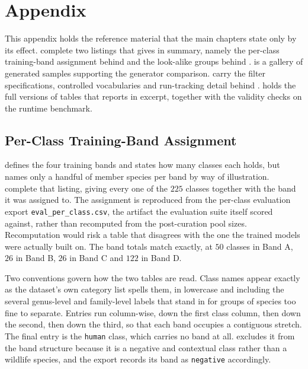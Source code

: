 \chapter{Appendix}\label{appendix}

This appendix holds the reference material that the main chapters state only by its effect.  complete two listings that  gives in summary, namely the per-class training-band assignment behind  and the look-alike groups behind .  is a gallery of generated samples supporting the generator comparison.  carry the filter specifications, controlled vocabularies and run-tracking detail behind .  holds the full versions of tables that  reports in excerpt, together with the validity checks on the runtime benchmark.

\section{Per-Class Training-Band Assignment}\label{sec:appendix_band_assignment}

 defines the four training bands and states how many classes each holds, but names only a handful of member species per band by way of illustration.  complete that listing, giving every one of the $225$ classes together with the band it was assigned to. The assignment is reproduced from the per-class evaluation export \texttt{eval\_per\_class.csv}, the artifact the evaluation suite itself scored against, rather than recomputed from the post-curation pool sizes. Recomputation would risk a table that disagrees with the one the trained models were actually built on. The band totals match  exactly, at $50$ classes in Band A, $26$ in Band B, $26$ in Band C and $122$ in Band D.

Two conventions govern how the two tables are read. Class names appear exactly as the dataset's own category list spells them, in lowercase and including the several genus-level and family-level labels that stand in for groups of species too fine to separate. Entries run column-wise, down the first class column, then down the second, then down the third, so that each band occupies a contiguous stretch. The final entry is the \texttt{human} class, which carries no band at all.  excludes it from the band structure because it is a negative and contextual class rather than a wildlife species, and the export records its band as \texttt{negative} accordingly.

